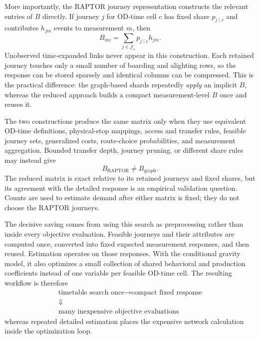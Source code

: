 More importantly, the RAPTOR journey representation constructs the relevant
entries of $B$ directly. If journey $j$ for OD-time cell $c$ has fixed share
$p_{j\mid c}$ and contributes $h_{jm}$ events to measurement $m$, then
\[
 B_{mc}=\sum_{j\in\mathcal J_c}p_{j\mid c}h_{jm}.
\]
Unobserved time-expanded links never appear in this construction. Each retained
journey touches only a small number of boarding and alighting rows, so the
response can be stored sparsely and identical columns can be compressed. This
is the practical difference: the graph-based shards repeatedly \emph{apply} an
implicit $B$, whereas the reduced approach builds a compact measurement-level
$B$ once and reuses it.

The two constructions produce the same matrix only when they use equivalent
OD-time definitions, physical-stop mappings, access and transfer rules,
feasible journey sets, generalized costs, route-choice probabilities, and
measurement aggregation. Bounded transfer depth, journey pruning, or different
share rules may instead give
\[
 B_{\mathrm{RAPTOR}}\ne B_{\mathrm{graph}}.
\]
The reduced matrix is exact relative to its retained journeys and fixed shares,
but its agreement with the detailed response is an empirical validation
question. Counts are used to estimate demand after either matrix is fixed; they
do not choose the RAPTOR journeys.

The decisive saving comes from using this search as preprocessing rather than
inside every objective evaluation. Feasible journeys and their attributes are
computed once, converted into fixed expected measurement responses, and then
reused. Estimation operates on those responses. With the conditional gravity
model, it also optimizes a small collection of shared behavioral and production
coefficients instead of one variable per feasible OD-time cell. The resulting
workflow is therefore
\[
 \begin{gathered}
   \text{timetable search once}
   \longrightarrow \text{compact fixed response}\\
   \Downarrow\\[-1mm]
   \text{many inexpensive objective evaluations}
 \end{gathered}
\]
whereas repeated detailed estimation places the expensive network calculation
inside the optimization loop.

